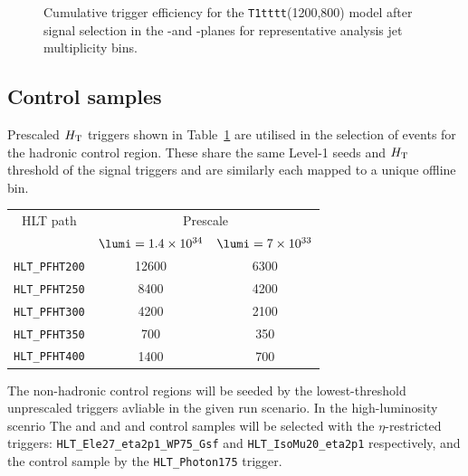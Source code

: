 \begin{figure}[h!]
\begin{center}
    \caption{
Cumulative trigger efficiency for the \texttt{T1tttt}(1200,800) model after signal selection in the \alphat-\scalht and \mht-\scalht planes for representative analysis jet multiplicity bins.}
    \label{fig:T1ttt_Trigger_Efficiency}
  \end{center} 
\end{figure}







\subsection{Control samples\label{sec:control_samples}}
Prescaled $\mbox{$H_\text{T}$}$ triggers shown in Table~\ref{tab:2015_Hadronic_Control_Triggers} are utilised in the selection of events for the hadronic control region. These share the same Level-1 seeds and $\mbox{$H_\text{T}$}$ threshold of the signal triggers and are similarly each mapped to a unique offline bin. 


\begin{table}[h!]
\footnotesize
\centering
\begin{tabular}{c|cc} 
\hline
\hline
HLT path & \multicolumn{2}{c}{Prescale} \\
         & $\lumi=1.4\times10^{34}$  & $\lumi=7\times10^{33}$     \\
\hline
\verb!HLT_PFHT200! & 12600 & 6300 \\
\verb!HLT_PFHT250! & 8400  & 4200 \\
\verb!HLT_PFHT300! & 4200  & 2100 \\
\verb!HLT_PFHT350! & 700   & 350  \\
\verb!HLT_PFHT400! & 1400  & 700  \\
\hline
\hline

\end{tabular}
\label{tab:2015_Hadronic_Control_Triggers}
\end{table}


The non-hadronic control regions will be seeded by the lowest-threshold unprescaled 
triggers avliable in the given run scenario. In the high-luminosity scenrio The \ej 
and \eej and \mj and \mmj control samples will be selected with the $\eta$-restricted 
triggers: \verb!HLT_Ele27_eta2p1_WP75_Gsf! and \verb!HLT_IsoMu20_eta2p1! respectively,
and the \gj control sample by the \verb!HLT_Photon175! trigger. 

